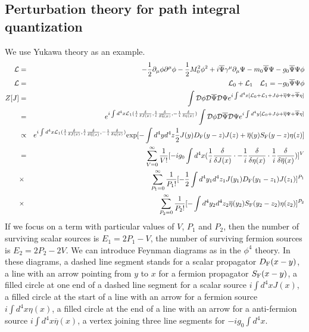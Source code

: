 \subsection{Perturbation theory for path integral quantization}
\noindent
We use Yukawa theory as an example.
\begin{eqnarray}
\mathcal{L} &=& -\frac{1}{2}\partial_{\mu} \phi \partial^{\mu} \phi -\frac{1}{2}M_0^2 \phi^2 + i\overline{\Psi} \gamma^{\mu} \partial_{\mu} \Psi - m_0\overline{\Psi}\Psi -g_0 \overline{\Psi}\Psi\phi \nonumber \\
\mathcal{L} &=& \mathcal{L}_0 + \mathcal{L}_1 \quad \mathcal{L}_1 =- g_0\overline{\Psi}\Psi\phi \nonumber \\
Z[J] &=& \int \mathcal{D}\phi \mathcal{D}\overline{\Psi} \mathcal{D}\Psi e^{i\int d^4x [\mathcal{L}_0 + \mathcal{L}_1 + J\phi + \overline{\eta}\Psi +  \overline{\Psi}\eta]} \nonumber \\
&=& e^{i\int d^4x \mathcal{L}_1(\frac{1}{i} \frac{\delta}{\delta J(x)},\frac{1}{i}\frac{\delta}{\delta \overline{\eta}(x)},-\frac{1}{i}\frac{\delta}{\delta \eta(x)})} \int \mathcal{D}\phi \mathcal{D}\overline{\Psi} \mathcal{D}\Psi e^{i\int d^4y [\mathcal{L}_0 + J\phi + \overline{\eta}\Psi +  \overline{\Psi}\eta]} \nonumber \\
&\propto & e^{i\int d^4x \mathcal{L}_1(\frac{1}{i} \frac{\delta}{\delta J(x)},\frac{1}{i}\frac{\delta}{\delta \overline{\eta}(x)},-\frac{1}{i}\frac{\delta}{\delta \eta(x)})} \mathrm{exp} [- \int d^4y d^4z  \frac{1}{2} J(y)D_{\rm F}(y-z)J(z) + \overline{\eta}(y)S_{\rm F}(y-z)\eta(z)] \nonumber \\
& =& \sum_{V=0}^{\infty} \frac{1}{V!} [-ig_0 \int d^4x (\frac{1}{i} \frac{\delta}{\delta J(x)}  \cdot -\frac{1}{i}\frac{\delta}{\delta \eta(x)} \cdot \frac{1}{i}\frac{\delta}{\delta \overline{\eta}(x)})]^V \nonumber \\
&\times & \sum_{P_1=0}^{\infty} \frac{1}{P_1!} [-\frac{1}{2} \int d^4y_1 d^4z_1 J(y_1)D_{\rm F}(y_1-z_1)J(z_1)]^{P_1} \nonumber \\
&\times &  \sum_{P_2=0}^{\infty} \frac{1}{P_2!} [-\int d^4y_2 d^4z_2 \overline{\eta}(y_2)S_{\rm F}(y_2-z_2)\eta(z_2)]^{P_2} \nonumber
\end{eqnarray}
If we focus on a term with particular values of $V$, $P_1$ and $P_2$, then the number of surviving scalar sources is $E_1 = 2P_1-V$, the number of surviving fermion sources is $E_2 = 2P_2-2V$.
We can introduce Feynman diagrams as in the $\phi^4$ theory. In these diagrams, a dashed line segment stands for a scalar propagator $D_{\rm F}(x-y)$, a line with an arrow pointing from $y$ to $x$ for a fermion propagator $S_{\rm F}(x-y)$, a filled circle at one end of a dashed line segment for a scalar source $i\int d^4x J(x)$, a filled circle at the start of a line with an arrow for a fermion source $i\int d^4x \eta(x)$, a filled circle at the end of a line with an arrow for a anti-fermion source $i\int d^4x \overline{\eta}(x)$, a vertex joining three line segments for $-ig_0\int d^4x$.

